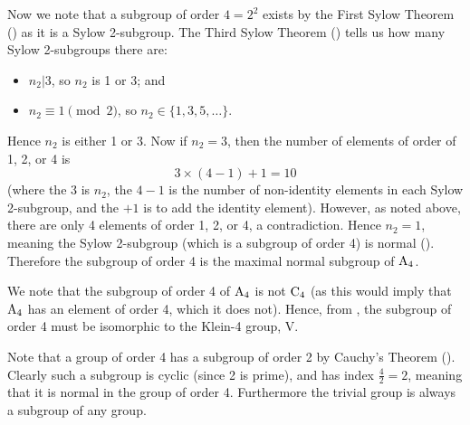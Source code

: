 \begin{enumerate}
    Now we note that a subgroup of order $4 = 2^2$ exists by the First Sylow Theorem () as it is a Sylow 2-subgroup. The Third Sylow Theorem () tells us how many Sylow 2-subgroups there are:
    \begin{itemize}
        \item $n_2 \vert 3$, so $n_2$ is 1 or 3; and
        \item $n_2 \equiv 1 \pmod2$, so $n_2 \in \{1, 3, 5, \dots\}$.
    \end{itemize}
    Hence $n_2$ is either 1 or 3. Now if $n_2 = 3$, then the number of elements of order of 1, 2, or 4 is
    \[
        3 \times (4 - 1) + 1 = 10
    \]
    (where the 3 is $n_2$, the $4-1$ is the number of non-identity elements in each Sylow 2-subgroup, and the $+1$ is to add the identity element). However, as noted above, there are only 4 elements of order 1, 2, or 4, a contradiction. Hence $n_2 = 1$, meaning the Sylow 2-subgroup (which is a subgroup of order 4) is normal (). Therefore the subgroup of order 4 is the maximal normal subgroup of $\mathrm{A}_{4}$.
    
    We note that the subgroup of order 4 of $\mathrm{A}_{4}$ is not $\mathrm{C}_{4}$ (as this would imply that $\mathrm{A}_{4}$ has an element of order 4, which it does not). Hence, from , the subgroup of order 4 must be isomorphic to the Klein-4 group, $\mathrm{V}$.
    
    Note that a group of order 4 has a subgroup of order 2 by Cauchy's Theorem (). Clearly such a subgroup is cyclic (since 2 is prime), and has index $\frac42 = 2$, meaning that it is normal in the group of order 4. Furthermore the trivial group is always a subgroup of any group.
    

\end{enumerate}
